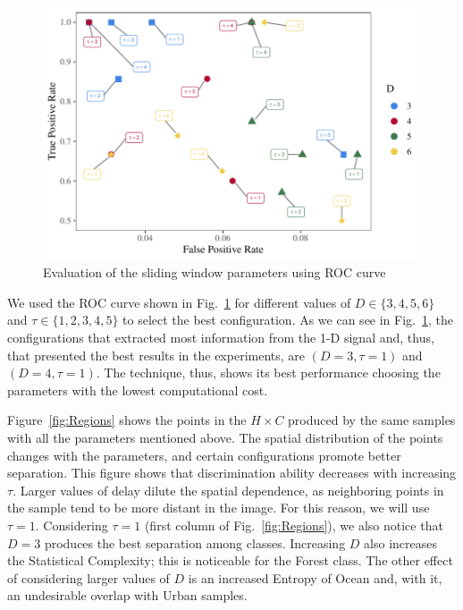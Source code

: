 \documentclass[journal]{IEEEtran}
\begin{document}
	\begin{figure}[hbt]
		\includegraphics[width=\columnwidth]{Figures/ROC.pdf}
		\caption{Evaluation of the sliding window parameters using ROC curve}
		\label{fig:ROC}
	\end{figure} 
	
	We used the ROC curve shown in Fig.~\ref{fig:ROC} for different values of $D \in \{3, 4, 5, 6 \} $ and $\tau \in \{1, 2, 3, 4, 5 \}$ to select the best configuration.
	As we can see in Fig.~\ref{fig:ROC}, the configurations that extracted most information from the \mbox{1-D} signal and, thus, that presented the best results in the experiments, are $(D = 3, \tau = 1)$ and $(D = 4, \tau = 1)$.
	The technique, thus, shows its best performance choosing the parameters with the lowest computational cost.
	
	Figure~\ref{fig:Regions} shows the points in the $H\times C$ produced by the same samples with all the parameters mentioned above.
	The spatial distribution of the points changes with the parameters,
	and certain configurations promote better separation.
	This figure shows that discrimination ability decreases with increasing $\tau$.
	Larger values of delay dilute the spatial dependence, as neighboring points in the sample tend to be more distant in the image.
	For this reason, we will use $\tau=1$.
	Considering $\tau=1$ (first column of Fig.~\ref{fig:Regions}), 
	we also notice that $D=3$ produces the best separation among classes.
	Increasing $D$ also increases the Statistical Complexity; this is noticeable for the Forest class.
	The other effect of considering larger values of $D$ is an increased Entropy of Ocean and, with it, an undesirable overlap with Urban samples.
	
\end{document}
